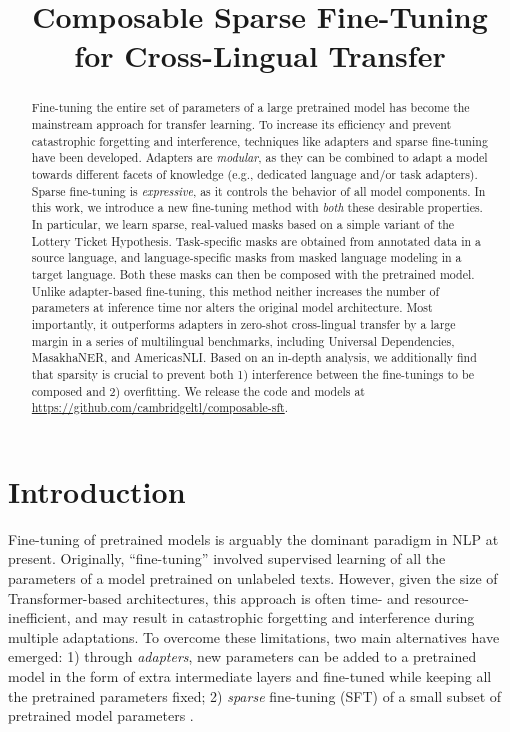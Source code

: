 \title{Composable Sparse Fine-Tuning for Cross-Lingual Transfer}

\begin{abstract}
Fine-tuning the entire set of parameters of a large pretrained model has become the mainstream approach for transfer learning. To increase its efficiency and prevent catastrophic forgetting and interference, techniques like adapters and sparse fine-tuning have been developed. Adapters are \textit{modular}, as they can be combined to adapt a model towards different facets of knowledge (e.g., dedicated language and/or task adapters). Sparse fine-tuning is \textit{expressive}, as it controls the behavior of all model components. In this work, we introduce a new fine-tuning method with \textit{both} these desirable properties. In particular, we learn sparse, real-valued masks based on a simple variant of the Lottery Ticket Hypothesis. Task-specific masks are obtained from annotated data in a source language, and language-specific masks from masked language modeling in a target language. Both these masks can then be composed with the pretrained model. Unlike adapter-based fine-tuning, this method neither increases the number of parameters at inference time nor alters the original model architecture. Most importantly, it outperforms adapters in zero-shot cross-lingual transfer by a large margin in a series of multilingual benchmarks, including Universal Dependencies, MasakhaNER, and AmericasNLI. Based on an in-depth analysis, we additionally find that sparsity is crucial to prevent both 1) interference between the fine-tunings to be composed and 2) overfitting. We release the code and models at \url{https://github.com/cambridgeltl/composable-sft}.
\end{abstract}

\section{Introduction}

Fine-tuning of pretrained models \citep[\textit{inter alia}]{howard-ruder-2018-universal,devlin-etal-2019-bert} is arguably the dominant paradigm in NLP at present. Originally, ``fine-tuning'' involved supervised learning of all the parameters of a model pretrained on unlabeled texts. However, given the size of Transformer-based architectures, this approach is often time- and resource- inefficient, and may result in catastrophic forgetting and interference \cite{Wang:2020emnlp} during multiple adaptations. To overcome these limitations, two main alternatives have emerged: 1) through \textit{adapters}, new parameters can be added to a pretrained model in the form of extra intermediate layers \citep{rebuffi-etal-2017-learning,houlsby-etal-2019-parameter} and fine-tuned while keeping all the pretrained parameters fixed; 2) \textit{sparse} fine-tuning (SFT) of a small subset of pretrained model parameters \citep[\textit{inter alia}]{guo-etal-2021-parameter,zaken-etal-2021-bitfit,xu-etal-2021-raise}.

